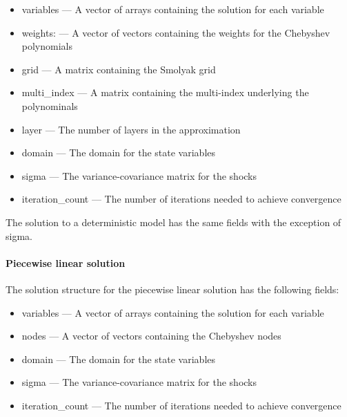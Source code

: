 \documentclass[notitlepage,11pt]{article}
\begin{document}
\begin{itemize}
\item variables --- A vector of arrays containing the solution for each
variable

\item weights: --- A vector of vectors containing the weights for the
Chebyshev polynomials

\item grid --- A matrix containing the Smolyak grid

\item multi\_index --- A matrix containing the multi-index underlying the
polynominals

\item layer --- The number of layers in the approximation

\item domain --- The domain for the state variables

\item sigma --- The variance-covariance matrix for the shocks

\item iteration\_count --- The number of iterations needed to achieve
convergence
\end{itemize}

The solution to a deterministic model has the same fields with the exception
of sigma.

\paragraph{Piecewise linear solution}

The solution structure for the piecewise linear solution has the following
fields:

\begin{itemize}
\item variables --- A vector of arrays containing the solution for each
variable

\item nodes --- A vector of vectors containing the Chebyshev nodes

\item domain --- The domain for the state variables

\item sigma --- The variance-covariance matrix for the shocks

\item iteration\_count --- The number of iterations needed to achieve
convergence
\end{itemize}
\end{document}
